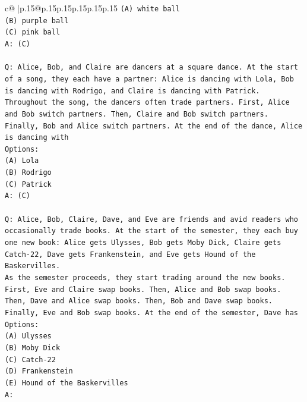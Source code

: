 \documentclass{article}
\begin{document}
{\begin{supertabular}{c@{$\;$}|p{.15\linewidth}@{}p{.15\linewidth}p{.15\linewidth}p{.15\linewidth}p{.15\linewidth}p{.15\linewidth}}
{{{\texttt{(A) white ball} \\
\texttt{(B) purple ball} \\
\texttt{(C) pink ball} \\
\texttt{A: (C)} \\
\\ 
\texttt{Q: Alice, Bob, and Claire are dancers at a square dance. At the start of a song, they each have a partner: Alice is dancing with Lola, Bob is dancing with Rodrigo, and Claire is dancing with Patrick.} \\
\texttt{Throughout the song, the dancers often trade partners. First, Alice and Bob switch partners. Then, Claire and Bob switch partners. Finally, Bob and Alice switch partners. At the end of the dance, Alice is dancing with} \\
\texttt{Options:} \\
\texttt{(A) Lola} \\
\texttt{(B) Rodrigo} \\
\texttt{(C) Patrick} \\
\texttt{A: (C)} \\
\\ 
\texttt{Q: Alice, Bob, Claire, Dave, and Eve are friends and avid readers who occasionally trade books. At the start of the semester, they each buy one new book: Alice gets Ulysses, Bob gets Moby Dick, Claire gets Catch{-}22, Dave gets Frankenstein, and Eve gets Hound of the Baskervilles.} \\
\texttt{As the semester proceeds, they start trading around the new books. First, Eve and Claire swap books. Then, Alice and Bob swap books. Then, Dave and Alice swap books. Then, Bob and Dave swap books. Finally, Eve and Bob swap books. At the end of the semester, Dave has} \\
\texttt{Options:} \\
\texttt{(A) Ulysses} \\
\texttt{(B) Moby Dick} \\
\texttt{(C) Catch{-}22} \\
\texttt{(D) Frankenstein} \\
\texttt{(E) Hound of the Baskervilles} \\
\texttt{A:} \\
            }
        }
    }
     \\ \\


\end{supertabular}}
\end{document}
